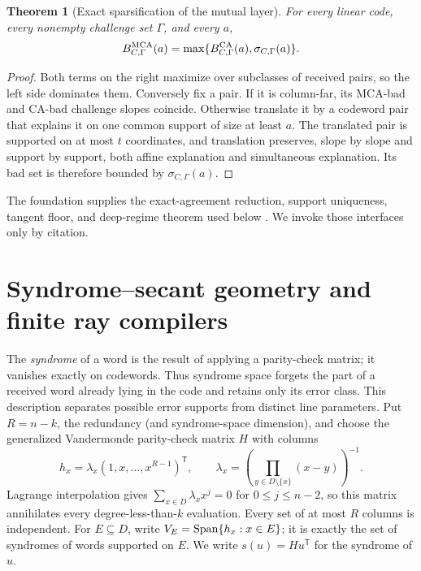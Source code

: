 \documentclass[11pt,a4paper]{amsart}
\numberwithin{equation}{section}
\newtheorem{theorem}{Theorem}[section]
\theoremstyle{remark}
\begin{document}
\begin{theorem}[Exact sparsification of the mutual layer]\label{thm:exact-sparsification}
For every linear code, every nonempty challenge set $\Gamma$, and every $a$,
\begin{equation}
 B^{\rm MCA}_{C,\Gamma}(a)=
 \max\{B^{\rm CA}_{C,\Gamma}(a),\sigma_{C,\Gamma}(a)\}.\label{eq:exact-sparsification}
\end{equation}
\end{theorem}
\begin{proof}
Both terms on the right maximize over subclasses of received pairs, so the left side dominates them.  Conversely fix a pair.  If it is column-far, its MCA-bad and CA-bad challenge slopes coincide.  Otherwise translate it by a codeword pair that explains it on one common support of size at least $a$.  The translated pair is supported on at most $t$ coordinates, and translation preserves, slope by slope and support by support, both affine explanation and simultaneous explanation.  Its bad set is therefore bounded by $\sigma_{C,\Gamma}(a)$.
\end{proof}

The foundation supplies the exact-agreement reduction, support uniqueness, tangent floor, and deep-regime theorem used below \cite[Secs.~13--14]{CAP25v132}.  We invoke those interfaces only by citation.

\section{Syndrome--secant geometry and finite ray compilers}
\label{sec:syndrome-exact}

The \emph{syndrome} of a word is the result of applying a parity-check
matrix; it vanishes exactly on codewords.  Thus syndrome space forgets the
part of a received word already lying in the code and retains only its error
class.  This description separates possible error supports from distinct
line parameters.  Put \(R=n-k\), the redundancy (and syndrome-space
dimension), and choose the generalized Vandermonde parity-check matrix
\(H\) with columns
\begin{equation}
 h_x=\lambda_x(1,x,\ldots,x^{R-1})^{\mathsf T},\qquad
 \lambda_x=\left(\prod_{y\in D\setminus\{x\}}(x-y)\right)^{-1}.\label{eq:parity-columns}
\end{equation}
Lagrange interpolation gives
\(\sum_{x\in D}\lambda_xx^j=0\) for \(0\le j\le n-2\), so this matrix
annihilates every degree-less-than-\(k\) evaluation.  Every set of at most
\(R\) columns is independent.  For \(E\subseteq D\), write
\(V_E=\operatorname{Span}\{h_x:x\in E\}\); it is exactly the set of syndromes of words
supported on \(E\).  We write \(s(u)=Hu^{\mathsf T}\) for the syndrome of
\(u\).
\end{document}
